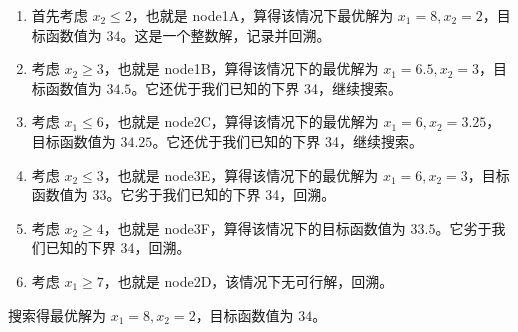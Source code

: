 \begin{enumerate}
    \item 首先考虑 $x_2 \le 2$，也就是 node1A，算得该情况下最优解为 $x_1 = 8, x_2 = 2$，目标函数值为 $34$。这是一个整数解，记录并回溯。
    \item 考虑 $x_2 \ge 3$，也就是 node1B，算得该情况下的最优解为 $x_1 = 6.5, x_2 = 3$，目标函数值为 $34.5$。它还优于我们已知的下界 34，继续搜索。
    \item 考虑 $x_1 \le 6$，也就是 node2C，算得该情况下的最优解为 $x_1 = 6, x_2 = 3.25$，目标函数值为 $34.25$。它还优于我们已知的下界 34，继续搜索。
    \item 考虑 $x_2 \le 3$，也就是 node3E，算得该情况下的最优解为 $x_1 = 6, x_2 = 3$，目标函数值为 $33$。它劣于我们已知的下界 34，回溯。
    \item 考虑 $x_2 \ge 4$，也就是 node3F，算得该情况下的目标函数值为 $33.5$。它劣于我们已知的下界 $34$，回溯。
    \item 考虑 $x_1 \ge 7$，也就是 node2D，该情况下无可行解，回溯。
\end{enumerate}
搜索得最优解为 $x_1 = 8, x_2 = 2$，目标函数值为 $34$。

\pagebreak
